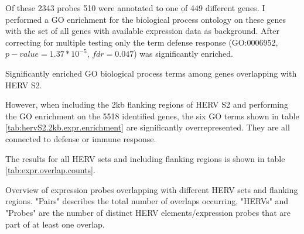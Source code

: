 \documentclass[a4paper,12pt,twoside,openright]{report}
\begin{document}
Of these 2343 probes 510 were annotated to one of 449 different genes. I performed a GO enrichment for the biological process ontology on these genes with the set of all genes with available expression data as background. After correcting for multiple testing only the term defense response (GO:0006952, $p-value=1.37*10^{-5}$, $fdr=0.047$) was significantly enriched.

\begin{table}[h!]
  \begin{center}
  \end{center}        
	\caption{Significantly enriched GO biological process terms among genes overlapping with HERV S2.}
	\label{tab:hervS2.2kb.expr.enrichment}
\end{table}

However, when including the 2kb flanking regions of HERV S2 and performing the GO enrichment on the 5518 identified genes, the six GO terms shown in table \ref{tab:hervS2.2kb.expr.enrichment} are significantly overrepresented. They are all connected to defense or immune response.

The results for all HERV sets and including flanking regions is shown in table \ref{tab:expr.overlap.counts}.

\begin{table}[h!]
  \begin{center}
  \end{center}        
	\caption{Overview of expression probes overlapping with different HERV sets and flanking regions. "Pairs" describes the total number of overlaps occurring, "HERVs" and "Probes" are the number of distinct HERV elements/expression probes that are part of at least one overlap.}
	\label{tab:expr.overlap.counts}
\end{table}
\end{document}
